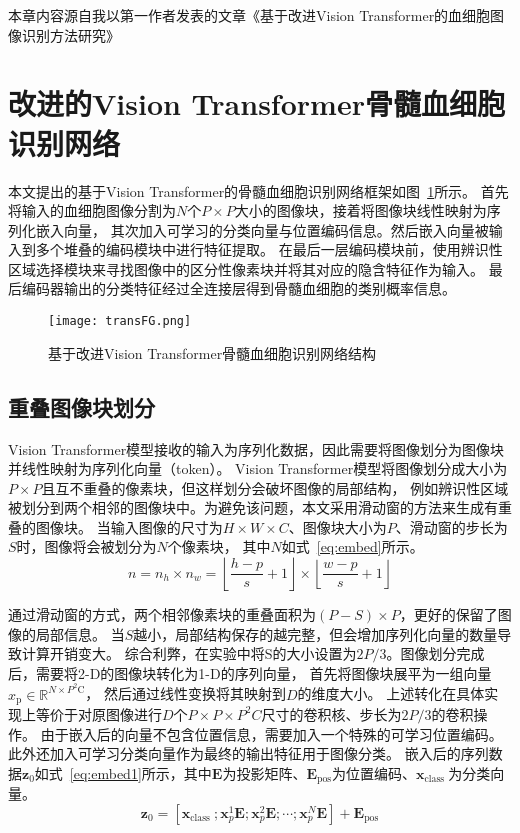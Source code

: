 本章内容源自我以第一作者发表的文章《基于改进Vision Transformer的血细胞图像识别方法研究》\cite{SWGC202206005}

\section{改进的Vision Transformer骨髓血细胞识别网络}

本文提出的基于Vision Transformer的骨髓血细胞识别网络框架如图~\ref{fig:vit}所示。
首先将输入的血细胞图像分割为$N$个$P \times P$大小的图像块，接着将图像块线性映射为序列化嵌入向量，
其次加入可学习的分类向量与位置编码信息。然后嵌入向量被输入到多个堆叠的编码模块中进行特征提取。
在最后一层编码模块前，使用辨识性区域选择模块来寻找图像中的区分性像素块并将其对应的隐含特征作为输入。
最后编码器输出的分类特征经过全连接层得到骨髓血细胞的类别概率信息。

\begin{figure} 
   \centering   
   \texttt{[image: transFG.png]}   
   \caption{基于改进Vision Transformer骨髓血细胞识别网络结构}   
   \label{fig:vit} 
\end{figure}  

\subsection{重叠图像块划分}
Vision Transformer模型接收的输入为序列化数据，因此需要将图像划分为图像块并线性映射为序列化向量（token）。
Vision Transformer模型将图像划分成大小为$P \times P$且互不重叠的像素块，但这样划分会破坏图像的局部结构，
例如辨识性区域被划分到两个相邻的图像块中。为避免该问题，本文采用滑动窗的方法来生成有重叠的图像块。
当输入图像的尺寸为$H \times W \times C$、图像块大小为$P$、滑动窗的步长为$S$时，图像将会被划分为$N$个像素块，
其中$N$如式~\ref{eq:embed}所示。
\begin{equation}
  n=n_{h} \times n_{w}=\left\lfloor\frac{h-p}{s}+1\right\rfloor \times\left\lfloor\frac{w-p}{s}+1\right\rfloor
  \label{eq:embed}
\end{equation}

通过滑动窗的方式，两个相邻像素块的重叠面积为$(P-S) \times P$，更好的保留了图像的局部信息。
当$S$越小，局部结构保存的越完整，但会增加序列化向量的数量导致计算开销变大。
综合利弊，在实验中将S的大小设置为$2P/3$。图像划分完成后，需要将2-D的图像块转化为1-D的序列向量，
首先将图像块展平为一组向量$x_{\mathrm{p}} \in \mathbb{R}^{N \times P^{2} \mathrm{C}}$，
然后通过线性变换将其映射到$D$的维度大小。
上述转化在具体实现上等价于对原图像进行$D$个$P \times P \times P^2C$尺寸的卷积核、步长为$2P/3$的卷积操作。
由于嵌入后的向量不包含位置信息，需要加入一个特殊的可学习位置编码。
此外还加入可学习分类向量作为最终的输出特征用于图像分类。
嵌入后的序列数据$\mathbf{z}_{0}$如式~\ref{eq:embed1}所示，其中$\boldsymbol{E}$为投影矩阵、$\boldsymbol{E}_{\mathrm{pos}}$为位置编码、$\boldsymbol{x}_{\text {class }}$为分类向量。
\begin{equation}
    \mathbf{z}_{0}=\left[\boldsymbol{x}_{\text {class }} ; \boldsymbol{x}_{p}^{1} \boldsymbol{E} ; \boldsymbol{x}_{p}^{2} \boldsymbol{E} ; \cdots ; \boldsymbol{x}_{p}^{N} \boldsymbol{E}\right]+\boldsymbol{E}_{\mathrm{pos}}
    \label{eq:embed1}
\end{equation}

